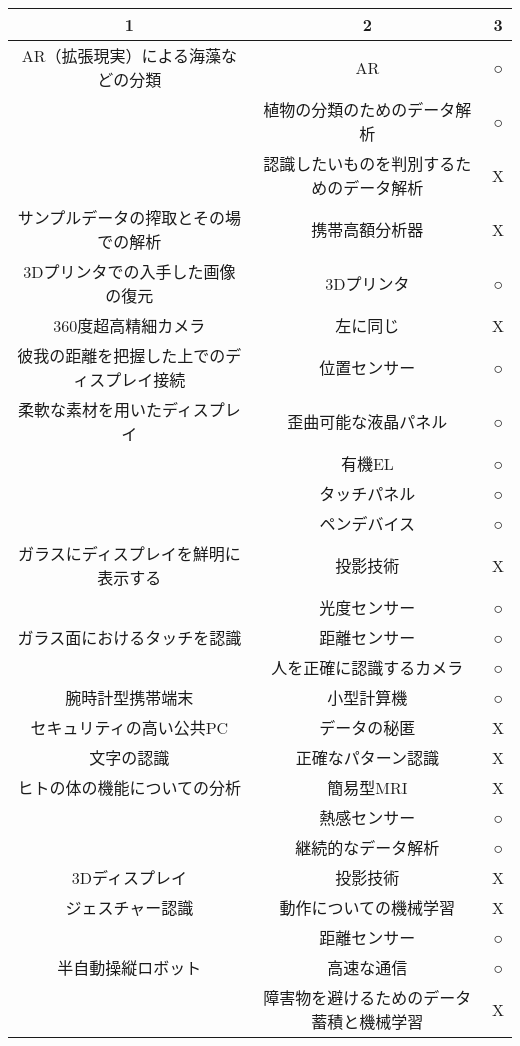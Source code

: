 \documentclass{scrartcl}
\begin{document}
\begin{center}
\begin{tabular}{||c||c||c||}
\hline
\hline
1 & 2 & 3\\
\hline
\hline
AR（拡張現実）による海藻などの分類 & AR & ○\\
 & 植物の分類のためのデータ解析 & ○\\
 & 認識したいものを判別するためのデータ解析 & X\\
\hline
サンプルデータの搾取とその場での解析 & 携帯高額分析器 & X\\
\hline
3Dプリンタでの入手した画像の復元 & 3Dプリンタ　 & ○\\
\hline
360度超高精細カメラ & 左に同じ & X\\
\hline
彼我の距離を把握した上でのディスプレイ接続 & 位置センサー & ○\\
\hline
柔軟な素材を用いたディスプレイ & 歪曲可能な液晶パネル & ○\\
 & 有機EL & ○\\
 & タッチパネル & ○\\
 & ペンデバイス & ○\\
\hline
ガラスにディスプレイを鮮明に表示する & 投影技術 & X\\
 & 光度センサー & ○\\
\hline
ガラス面におけるタッチを認識 & 距離センサー & ○\\
 & 人を正確に認識するカメラ & ○\\
\hline
腕時計型携帯端末 & 小型計算機 & ○\\
\hline
セキュリティの高い公共PC & データの秘匿 & X\\
\hline
文字の認識 & 正確なパターン認識 & X\\
\hline
ヒトの体の機能についての分析 & 簡易型MRI & X\\
 & 熱感センサー & ○\\
 & 継続的なデータ解析 & ○\\
\hline
3Dディスプレイ & 投影技術 & X\\
\hline
ジェスチャー認識 & 動作についての機械学習 & X\\
 & 距離センサー & ○\\
\hline
半自動操縦ロボット & 高速な通信 & ○\\
 & 障害物を避けるためのデータ蓄積と機械学習 & X\\
\hline
\hline
\end{tabular}
\end{center}
\end{document}
